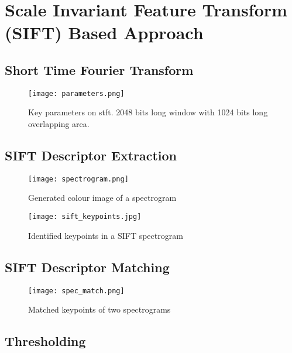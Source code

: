 \section{Scale Invariant Feature Transform (SIFT) Based Approach}

\subsection{Short Time Fourier Transform}

\begin{figure}[H]
    \centering
    \texttt{[image: parameters.png]}
    \caption{Key parameters on \ac{stft}. 2048 bits long window with 1024 bits long overlapping area.}
    \label{fig:spectrogram_parameters}
  \end{figure}

\subsection{SIFT Descriptor Extraction}

\begin{figure}[H]
    \centering
    \texttt{[image: spectrogram.png]}
    \caption{Generated colour image of a spectrogram}
    \label{fig:spectrogram_design}
  \end{figure}

  \begin{figure}[H]
    \centering
    \texttt{[image: sift\_keypoints.jpg]}
    \caption{Identified keypoints in a SIFT spectrogram}
    \label{fig:spectrogram_keypoints}
  \end{figure}

\subsection{SIFT Descriptor Matching}

\begin{figure}[H]
    \centering
    \texttt{[image: spec\_match.png]}
    \caption{Matched keypoints of two spectrograms}
    \label{fig:spectrogram_match}
  \end{figure}

\subsection{Thresholding}